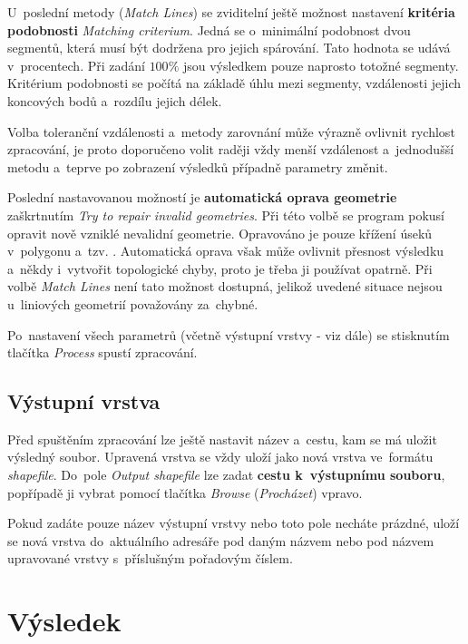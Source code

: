 U~poslední metody (\textit{Match Lines}) se zviditelní ještě možnost nastavení
\textbf{kritéria podobnosti} \textit{Matching criterium}. Jedná se o~minimální 
podobnost dvou segmentů, která musí být dodržena pro jejich spárování. 
Tato hodnota se udává v~procentech. Při zadání $100 \%$ jsou výsledkem pouze 
naprosto totožné segmenty. Kritérium podobnosti se počítá na základě úhlu mezi 
segmenty, vzdálenosti jejich koncových bodů a~rozdílu jejich délek. 

Volba toleranční vzdálenosti a~metody zarovnání může výrazně ovlivnit rychlost 
zpracování, je proto doporučeno volit raději vždy menší vzdálenost a~jednodušší
metodu a~teprve po zobrazení výsledků případně parametry změnit.

Poslední nastavovanou možností je \textbf{automatická oprava geometrie}
 zaškrtnutím \textit{Try to repair invalid geometries}. Při této volbě se 
program pokusí opravit nově vzniklé nevalidní geometrie. Opravováno je pouze 
křížení úseků v~polygonu a~tzv. . Automatická oprava však 
může ovlivnit přesnost výsledku a~někdy i~vytvořit topologické chyby, proto 
je třeba ji používat opatrně. Při volbě \textit{Match Lines} není tato možnost
dostupná, jelikož uvedené situace nejsou u~liniových geometrií považovány
za~chybné.

Po~nastavení všech parametrů (včetně výstupní vrstvy - viz dále) se stisknutím 
tlačítka \textit{Process} spustí zpracování. 

\subsection{Výstupní vrstva}

Před spuštěním zpracování lze ještě nastavit název a~cestu, kam se má uložit
výsledný soubor. Upravená vrstva se vždy uloží jako nová vrstva ve~formátu 
\textit{shapefile}. Do~pole \textit{Output shapefile} lze zadat \textbf{cestu 
k~výstupnímu souboru}, popřípadě ji vybrat pomocí tlačítka \textit{Browse} 
(\textit{Procházet}) vpravo. 

Pokud zadáte pouze název výstupní vrstvy nebo toto pole necháte prázdné, 
uloží se nová vrstva do~aktuálního adresáře pod daným názvem nebo pod názvem
upravované vrstvy s~příslušným pořadovým číslem. 


\section{Výsledek}
\label{prirucka-vysledek}

